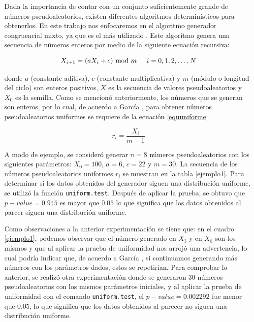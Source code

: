 \documentclass{article}
\begin{document}
Dada la importancia de contar con un conjunto suficientemente grande de números pseudoaleatorios, existen diferentes algoritmos determinísticos para obtenerlos. En este trabajo nos enfocaremos en el algoritmo generador congruencial mixto, ya que es el más utilizado \cite{promodel, hiller}. Este algoritmo genera una secuencia de números enteros por medio de la siguiente ecuación recursiva:

\begin{equation} \label{recursiva}
X_ {i+1}= (aX_{i} +c) \text{ mod } m \hspace{0,5cm}i=0, 1, 2, \dots, N
\end{equation}

donde $a$ (constante aditiva), $c$ (constante multiplicativa) y $m$ (módulo o longitud del ciclo) son enteros positivos, $X$ es la secuencia de valores pseudoaleatorios y $X_ {0}$ es la semilla. Como se mencionó anteriormente, los números que se generan son enteros, por lo cual, de acuerdo a García \cite{promodel}, para obtener números pseudoaleatorios uniformes se requiere de la ecuación \ref{equuniforme}.

\begin{equation} \label{equuniforme}
r_ {i}=\frac{X_{i}}{m-1}
\end{equation}

A modo de ejemplo, se consideró generar $n=8$ números pseudoaleatorios con los siguientes parámetros: $X_{0}=100$, $a = 6$, $c = 22$ y $m = 30$. La secuencia de los números pseudoaleatorios uniformes $r_{i}$ se muestran en la tabla \ref{ejemplo1}. Para determinar si los datos obtenidos del generador siguen una distribución uniforme, se utilizó la función \texttt{uniform.test}. Después de aplicar la prueba, se obtuvo que $p-value = 0.945$ es mayor que $0.05$ lo que significa que los datos obtenidos al parcer siguen una distribución uniforme. 

Como observaciones a la anterior experimentación se tiene que: en el cuadro \ref{ejemplo1}, podemos observar que el número generado en $X_{3}$ y en $X_{8}$ son los mismos y que al aplicar la prueba de uniformidad nos arrojó una advertencia, lo cual podría indicar que, de acuerdo a García \cite{promodel}, si continuamos generando más números con los parámetros dados, estos se repetirían. Para comprobar lo anterior, se realizó otra experimentación donde se generaron $30$ números pseudoaleatorios con los mismos parámetros iniciales, y al aplicar la prueba de uniformidad con el comando \texttt{uniform.test}, el $p-value = 0.002292$ fue menor que $0.05$, lo que significa que los datos obtenidos al parecer no siguen una distribución uniforme.
\end{document}
